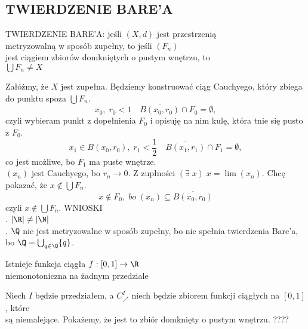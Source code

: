 \subsection{TWIERDZENIE BARE'A}
\begin{center}\large
    {\color{def}TWIERDZENIE BARE'A}: jeśli $(X,d)$ jest przestrzenią \\{\color{acc}metryzowalną w sposób zupełny}, to jeśli $(F_n)$ \\jest ciągiem zbiorów {\color{acc}domkniętych o pustym wnętrzu}, to\smallskip\\
    $\bigcup F_n\neq X$
\end{center}
\dowod
Załóżmy, że $X$ jest zupełna. Będziemy konstruować ciąg Cauchyego, który zbiega do punktu spoza $\bigcup F_n$.
$$x_0,\;r_0<1\quad \overline{B(x_0, r_0)}\cap F_0=\emptyset,$$
czyli wybieram punkt z dopełnienia $F_0$ i opisuję na nim kulę, która tnie się pusto z $F_0$.
$$x_1\in B(x_0, r_0), \;r_1<\frac12\quad \overline{B(x_1, r_1)}\cap F_1=\emptyset,$$
co jest możliwe, bo $F_1$ ma puste wnętrze.\bigskip\\
$(x_n)$ jest Cauchyego, bo $r_n\to0$. Z zupłności $(\exists\;x)\;x=\lim(x_n)$. Chcę pokazać, że $x\notin \bigcup F_n$.
$$x\notin F_0,\;bo\;(x_n)\subseteq \overline{B(x_0,r_0)}$$
czyli $x\notin\bigcup F_n$.
\kondow
{\large\color{acc}WNIOSKI}\medskip\\
. $|\R|\neq|\N|$\smallskip\\
. $\Q$ nie jest metryzowalne w sposób zupełny, bo nie spełnia twierdzenia Bare'a, \\bo $\Q=\bigcup_{q\in\Q}\{q\}$.\bigskip\\
\bigskip
\begin{center}\large
    {\color{acc}Istnieje funkcja ciągła $f:[0,1]\to\R$ \\niemonotoniczna na żadnym przedziale}
\end{center}
\dowod
Niech $I$ będzie przedziałem, a $C^I_\nearrow$ niech będzie zbiorem funkcji ciągłych na $[0,1]$, które \\są niemalejące. Pokażemy, że jest to zbiór domknięty o pustym wnętrzu. {\color{cyan}????}

